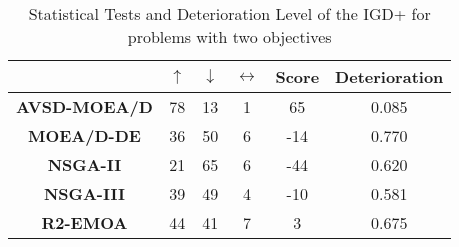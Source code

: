 \begin{table}[t]
\centering
	\caption{Statistical Tests and Deterioration Level of the IGD+ for problems with two objectives}
\label{tab:Tests_IGDP_2obj}
\begin{tabular}{c|c|c|c|c|c|}
\cline{2-6}
\textbf{} & \textbf{$\uparrow$} & \textbf{$\downarrow$} & \textbf{$\leftrightarrow$} & \textbf{Score} & \textbf{Deterioration} \\ \hline
\multicolumn{1}{|c|}{\textbf{AVSD-MOEA/D}} & 78 & 13 & 1 & 65 & 0.085 \\ \hline
\multicolumn{1}{|c|}{\textbf{MOEA/D-DE}} & 36 & 50 & 6 & -14 & 0.770 \\ \hline
\multicolumn{1}{|c|}{\textbf{NSGA-II}} & 21 & 65 & 6 & -44 & 0.620 \\ \hline
\multicolumn{1}{|c|}{\textbf{NSGA-III}} & 39 & 49 & 4 & -10 & 0.581 \\ \hline
\multicolumn{1}{|c|}{\textbf{R2-EMOA}} & 44 & 41 & 7 & 3 & 0.675 \\ \hline
\end{tabular}%
\end{table}

